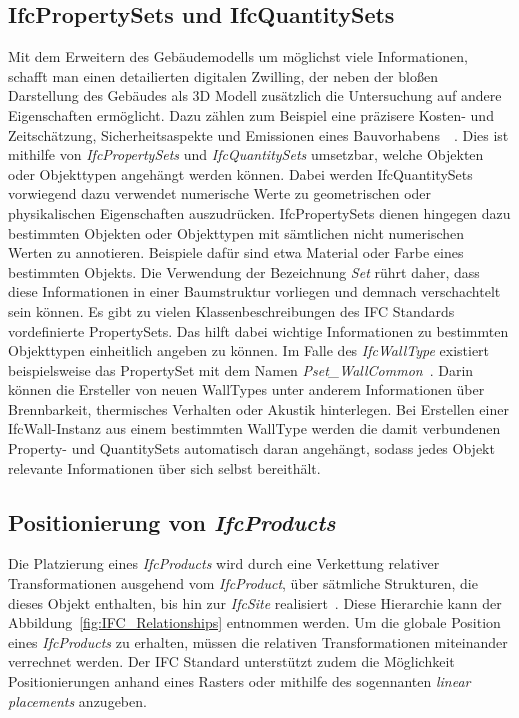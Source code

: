 \subsection{IfcPropertySets und IfcQuantitySets}\label{basics:ifc_properties}
Mit dem Erweitern des Gebäudemodells um möglichst viele Informationen, schafft man einen detailierten digitalen Zwilling, der neben der bloßen Darstellung des Gebäudes als 3D Modell zusätzlich die Untersuchung auf andere Eigenschaften ermöglicht.
Dazu zählen zum Beispiel eine präzisere Kosten- und Zeitschätzung, Sicherheitsaspekte und Emissionen eines Bauvorhabens~\cite{Industry93:online}~\cite{Ding2014}. 
Dies ist mithilfe von \textit{IfcPropertySets} und \textit{IfcQuantitySets} umsetzbar, welche Objekten oder Objekttypen angehängt werden können.
Dabei werden IfcQuantitySets vorwiegend dazu verwendet numerische Werte zu geometrischen oder physikalischen Eigenschaften auszudrücken.
IfcPropertySets dienen hingegen dazu bestimmten Objekten oder Objekttypen mit sämtlichen nicht numerischen Werten zu annotieren.
Beispiele dafür sind etwa Material oder Farbe eines bestimmten Objekts.
Die Verwendung der Bezeichnung \textit{Set} rührt daher, dass diese Informationen in einer Baumstruktur vorliegen und demnach verschachtelt sein können.
Es gibt zu vielen Klassenbeschreibungen des IFC Standards vordefinierte PropertySets.
Das hilft dabei wichtige Informationen zu bestimmten Objekttypen einheitlich angeben zu können.
Im Falle des \textit{IfcWallType} existiert beispielsweise das PropertySet mit dem Namen \textit{Pset\_WallCommon}~\cite{IFC4310PSetWallCommon:online}.
Darin können die Ersteller von neuen WallTypes unter anderem Informationen über Brennbarkeit, thermisches Verhalten oder Akustik hinterlegen.
Bei Erstellen einer IfcWall-Instanz aus einem bestimmten WallType werden die damit verbundenen Property- und QuantitySets automatisch daran angehängt, sodass jedes Objekt relevante Informationen über sich selbst bereithält.

\subsection{Positionierung von \textit{IfcProducts}}
Die Platzierung eines \textit{IfcProducts} wird durch eine Verkettung relativer Transformationen ausgehend vom \textit{IfcProduct}, über sätmliche Strukturen, die dieses Objekt enthalten, bis hin zur \textit{IfcSite} realisiert~\cite{IFCPlatzierung}.
Diese Hierarchie kann der Abbildung~\ref{fig:IFC_Relationships} entnommen werden.
Um die globale Position eines \textit{IfcProducts} zu erhalten, müssen die relativen Transformationen miteinander verrechnet werden.
Der IFC Standard unterstützt zudem die Möglichkeit Positionierungen anhand eines Rasters oder mithilfe des sogennanten \textit{linear placements} anzugeben.

